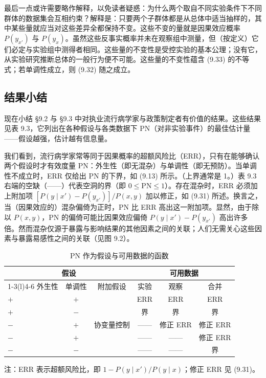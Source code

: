 最后一点或许需要略作解释，以免读者疑惑：为什么两个取自不同实验条件下不同群体的数据集会互相约束？解释是：只要两个子群体都是从总体中适当抽样的，其中某些量就应当对这些差异全都保持不变。这些不变的量就是因果效应概率 $P(y_{x'})$ 与 $P(y_x)$。虽然这些反事实概率并未在观察组中测量，但（按定义）它们必定与实验组中测得者相同。这些量的不变性是受控实验的基本公理；没有它，从实验研究推断总体的一般行为便不可能。这些量的不变性蕴含 \textup{(9.33)} 的不等式；若单调性成立，则 \textup{(9.32)} 随之成立。

\subsection{结果小结}

现在小结 \S 9.2 与 \S 9.3 中对执业流行病学家与政策制定者有价值的结果。这些结果见表 9.3，它列出在各种假设与各类数据下 PN（对非实验事件）的最佳估计量——假设越强，估计越有信息量。

我们看到，流行病学家常等同于因果概率的超额风险比（ERR），只有在能够确认两个假设时才有效度量 PN：外生性（即无混杂）与单调性（即无预防）。当单调性不成立时，ERR 仅给出 PN 的下界，如 \textup{(9.13)} 所示。（上界通常是 1。）表 9.3 右端的空缺（——）代表空洞的界（即 $0\le\mathrm{PN}\le1$）。存在混杂时，ERR 必须加上附加项 $[P(y\mid x')-P(y_{x'})]/P(x,y)$ 加以修正，如 \textup{(9.31)} 所述。换言之，当（因果效应的）混杂偏倚为正时，PN 比 ERR 高出这一附加项。显然，由于除以 $P(x,y)$，PN 的偏倚可能比因果效应偏倚 $P(y\mid x')-P(y_{x'})$ 高出许多倍。然而混杂仅源于暴露与影响结果的其他因素之间的关联；人们无需关心这些因素与暴露易感性之间的关联（见图 9.2）。

\begin{table}[htbp]
\centering
\caption{PN 作为假设与可用数据的函数}
\label{tab:9.3}
\small
\begin{tabular}{lccccc}
\toprule
\multicolumn{3}{c}{假设} & \multicolumn{3}{c}{可用数据}\\
\cmidrule(lr){1-3}\cmidrule(l){4-6}
外生性 & 单调性 & 附加假设 & 实验 & 观察 & 合并\\
\midrule
$+$ & $+$ &            & ERR & ERR & ERR\\
$+$ & $-$ &            & 界  & 界  & 界\\
$-$ & $+$ & 协变量控制 & —— & 修正 ERR & 修正 ERR\\
$-$ & $+$ &            & —— & —— & 修正 ERR\\
$-$ & $-$ &            & —— & —— & 界\\
\bottomrule
\end{tabular}

\par\smallskip
{\footnotesize 注：ERR 表示超额风险比，即 $1-P(y\mid x')/P(y\mid x)$；修正 ERR 见 \textup{(9.31)}。}
\end{table}

